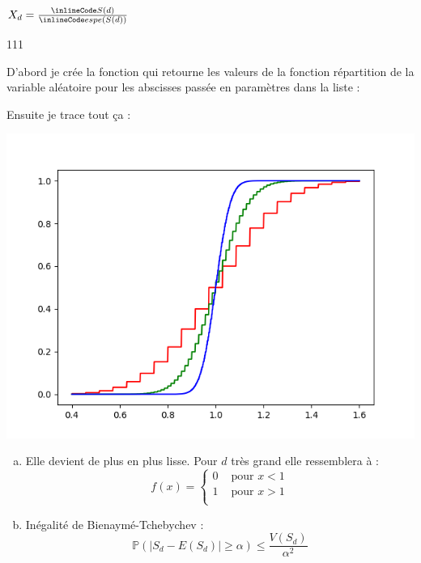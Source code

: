 $X_d = \frac{\il{S(d)}}{\il{espe(S(d))}}$

\begin{dinglist}{111}
  \item
  D'abord je crée la fonction  qui retourne les valeurs de la fonction répartition de la
  variable aléatoire  pour les abscisses passée en paramètres dans la liste  :

  \newpage

  \item
  Ensuite je trace tout ça :
  \begin{center}
    \includegraphics[scale=0.7]{section-06/q6-3.png}
  \end{center}

\end{dinglist}


\begin{enumerate}[(a)]
  \item {}
        Elle devient de plus en plus lisse.
        Pour $d$ très grand elle ressemblera à :
        \[
          f(x)=
          \left\{
          \begin{array}{rcl}
            0 & \text{ pour } x<1 \\
            1 & \text{ pour } x>1 \\
          \end{array}
          \right.
        \]

  \item {}
        Inégalité de Bienaymé-Tchebychev :
        \[
          \mathbb{P}(|S_d-E(S_d)| \geq \alpha) \leq \frac{V(S_d)}{\alpha^2}
        \]


\end{enumerate}
